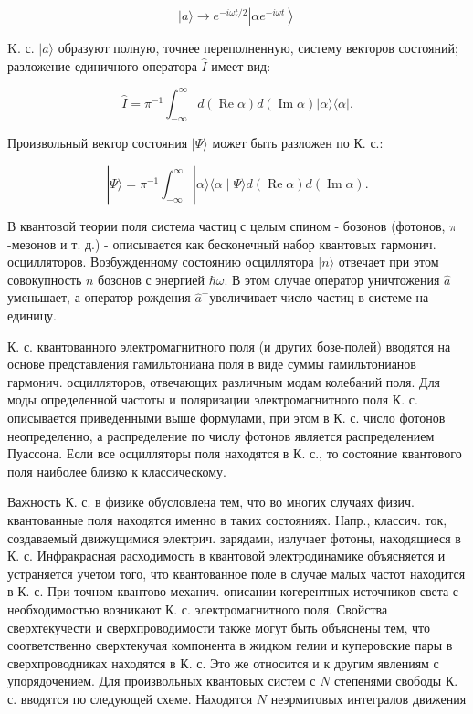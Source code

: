 \documentclass[10pt]{article}
\begin{document}
\[

|a\rangle \rightarrow e^{-i \omega t / 2}\left|\alpha e^{-i \omega t}\right\rangle

\]



K. с. $|a\rangle$ образуют полную, точнее переполненную, систему векторов состояний; разложение единичного оператора $\hat{I}$ имеет вид:



\[

\hat{I}=\pi^{-1} \int_{-\infty}^{\infty} d(\operatorname{Re} \alpha) d(\operatorname{Im} \alpha)|\alpha\rangle\langle\alpha| .

\]



Произвольный вектор состояния $|\Psi\rangle$ может быть разложен по К. с.:



\[

|\Psi\rangle=\pi^{-1} \int_{-\infty}^{\infty}|\alpha\rangle\langle\alpha \mid \Psi\rangle d(\operatorname{Re} \alpha) d(\operatorname{Im} \alpha) .

\]



В квантовой теории поля система частиц с целым спином - бозонов (фотонов, $\pi$-мезонов и т. д.) - описывается как бесконечный набор квантовых гармонич. осцилляторов. Возбужденному состоянию осциллятора $|n\rangle$ отвечает при этом совокупность $n$ бозонов с энергией $\hbar \omega$. В этом случае оператор уничтожения $\hat{a}$ уменьшает, а оператор рождения $\hat{a}^{+}$увеличивает число частиц в системе на единицу.



К. с. квантованного электромагнитного поля (и других бозе-полей) вводятся на основе представления гамильтониана поля в виде суммы гамильтонианов гармонич. осцилляторов, отвечающих различным модам колебаний поля. Для моды определенной частоты и поляризации электромагнитного поля К. с. описывается приведенными выше формулами, при этом в К. с. число фотонов неопределенно, а распределение по числу фотонов является распределением Пуассона. Если все осцилляторы поля находятся в К. с., то состояние квантового поля наиболее близко к классическому.



Важность К. с. в физике обусловлена тем, что во многих случаях физич. квантованные поля находятся именно в таких состояниях. Напр., классич. ток, создаваемый движущимися электрич. зарядами, излучает фотоны, находящиеся в К. с. Инфракрасная расходимость в квантовой электродинамике объясняется и устраняется учетом того, что квантованное поле в случае малых частот находится в К. с. При точном квантово-механич. описании когерентных источников света с необходимостью возникают К. с. электромагнитного поля. Свойства сверхтекучести и сверхпроводимости также могут быть объяснены тем, что соответственно сверхтекучая компонента в жидком гелии и куперовские пары в сверхпроводниках находятся в К. с. Это же относится и к другим явлениям с упорядочением. Для произвольных квантовых систем с $N$ степенями свободы К. с. вводятся по следующей схеме. Находятся $N$ неэрмитовых интегралов движения
\end{document}
